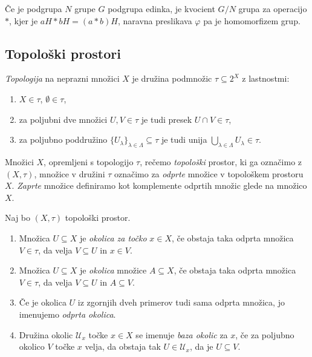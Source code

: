 \documentclass[mat1]{fmfdelo}
\newcommand{\Ucurl}{\mathcal{U}}
\begin{document}
\begin{trditev}
Če je podgrupa $N$ grupe $G$ podgrupa edinka, je kvocient $G/N$ grupa za operacijo $*$, kjer je $aH*bH = (a*b)H$, naravna preslikava $\varphi$ pa je homomorfizem grup.
\end{trditev}

\subsection{Topološki prostori}
\begin{definicija}\label{def:topologija}
\emph{Topologija} na neprazni množici $X$ je družina podmnožic $\tau \subseteq 2^X$ z lastnostmi:
\begin{enumerate}
\item $X \in \tau$, $\emptyset \in \tau$,
\item za poljubni dve množici $U,V \in \tau$ je tudi presek $U \cap V \in \tau$,
\item za poljubno poddružino $\lbrace U_{\lambda} \rbrace_{\lambda \in \Lambda} \subseteq \tau$ je tudi unija $\bigcup\limits_{\lambda \in \Lambda}^{} U_{\lambda} \in \tau$.
\end{enumerate}
Množici $X$, opremljeni s topologijo $\tau$, rečemo \emph{topološki} prostor, ki ga označimo z $(X, \tau)$, množice v družini $\tau$ označimo za \emph{odprte} množice v topološkem prostoru $X$. \emph{Zaprte} množice definiramo kot komplemente odprtih množic glede na množico $X$.
\end{definicija}


\begin{definicija}\label{def:okolica}
Naj bo $(X, \tau)$ topološki prostor.
\begin{enumerate}
\item Množica $U \subseteq X$ je \emph{okolica za točko} $x \in X$, če obstaja taka odprta množica $V \in \tau$, da velja $V \subseteq U$ in $x \in V$.
\item Množica $U \subseteq X$ je \emph{okolica} množice $A \subseteq X$, če obstaja taka odprta množica $V \in \tau$, da velja $V \subseteq U$ in $A \subseteq V$.
\item Če je okolica $U$ iz zgornjih dveh primerov tudi sama odprta množica, jo imenujemo \emph{odprta okolica}.
\item Družina okolic $\Ucurl_x$ točke $x \in X$ se imenuje \emph{baza okolic} za $x$, če za poljubno okolico $V$ točke $x$ velja, da obstaja tak $U \in \Ucurl_x$, da je $U \subseteq V$.
\end{enumerate}
\end{definicija}
\end{document}
